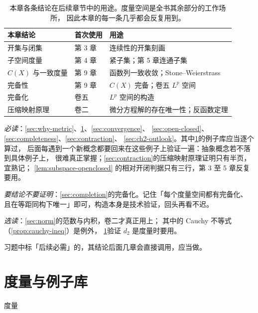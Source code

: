 \begin{table}[htbp]
  \centering
  \caption{本章各条结论在后续章节中的用途。度量空间是全书其余部分的工作场所，
    因此本章的每一条几乎都会反复用到。}
  \label{tab:ch2-where-used}
  \begin{tabular}{@{}lll@{}}
    \toprule
    本章结论 & 首次使用 & 用途 \\
    \midrule
    开集与闭集     & 第 3 章 & 连续性的开集刻画 \\
    子空间度量     & 第 4 章 & 紧子集；第 5 章连通子集 \\
    \(C(X)\) 与一致度量 & 第 9 章 & 函数列一致收敛；Stone--Weierstrass \\
    完备性         & 第 9 章 & \(C(X)\) 完备；卷五 \(L^{p}\) 空间 \\
    完备化         & 卷五     & \(L^{p}\) 空间的构造 \\
    压缩映射原理   & 卷二     & 微分方程解的存在唯一性；反函数定理 \\
    \bottomrule
  \end{tabular}
\end{table}

\begin{remark}[读法建议]
  \emph{必读}：\cref{sec:why-metric}、\cref{sec:metric-def}、\cref{sec:convergence}、
  \cref{sec:open-closed}、\cref{sec:completeness}、\cref{sec:contraction}、
  \cref{sec:ch2-outlook}。其中\cref{sec:metric-def}的例子库应当逐个算过，
  后面每遇到一个新概念都要回来在这些例子上验证一遍：抽象概念若不落到具体例子上，
  很难真正掌握；\cref{sec:contraction}的压缩映射原理证明只有半页，宜熟记；
  \cref{lem:subspace-openclosed} 的相对开闭判据只有三行，第 3 至 5 章反复要用。

  \emph{要结论不要证明}：\cref{sec:completion}的完备化。记住「每个度量空间都有完备化、
  且在等距同构下唯一」即可，构造本身是技术验证，回头再看不迟。

  \emph{选读}：\cref{sec:norm}的范数与内积，卷二才真正用上；
  其中的 Cauchy 不等式（\cref{prop:cauchy-ineq}）是例外，
  \cref{sec:metric-def}验证 \(d_{2}\) 是度量时要用。

  习题中标「后续必需」的，其结论后面几章会直接调用，应当做。
\end{remark}

\section{度量与例子库}
\label{sec:metric-def}

\begin{concept}{度量}
\end{concept}

